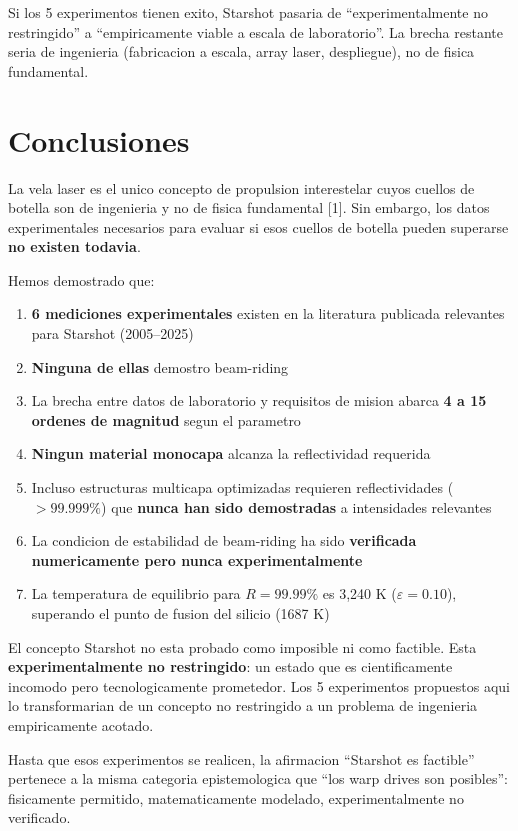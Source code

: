 \documentclass[11pt,a4paper,onecolumn]{article}
\begin{document}
Si los 5 experimentos tienen exito, Starshot pasaria de ``experimentalmente no restringido'' a ``empiricamente viable a escala de laboratorio''. La brecha restante seria de ingenieria (fabricacion a escala, array laser, despliegue), no de fisica fundamental.

\section{Conclusiones}

La vela laser es el unico concepto de propulsion interestelar cuyos cuellos de botella son de ingenieria y no de fisica fundamental [1]. Sin embargo, los datos experimentales necesarios para evaluar si esos cuellos de botella pueden superarse \textbf{no existen todavia}.

Hemos demostrado que:

\begin{enumerate}
  \item \textbf{6 mediciones experimentales} existen en la literatura publicada relevantes para Starshot (2005--2025)
  \item \textbf{Ninguna de ellas} demostro beam-riding
  \item La brecha entre datos de laboratorio y requisitos de mision abarca \textbf{4 a 15 ordenes de magnitud} segun el parametro
  \item \textbf{Ningun material monocapa} alcanza la reflectividad requerida
  \item Incluso estructuras multicapa optimizadas requieren reflectividades ($>99.999\%$) que \textbf{nunca han sido demostradas} a intensidades relevantes
  \item La condicion de estabilidad de beam-riding ha sido \textbf{verificada numericamente pero nunca experimentalmente}
  \item La temperatura de equilibrio para $R=99.99\%$ es 3,240 K ($\varepsilon=0.10$), superando el punto de fusion del silicio (1687 K)
\end{enumerate}

El concepto Starshot no esta probado como imposible ni como factible. Esta \textbf{experimentalmente no restringido}: un estado que es cientificamente incomodo pero tecnologicamente prometedor. Los 5 experimentos propuestos aqui lo transformarian de un concepto no restringido a un problema de ingenieria empiricamente acotado.

Hasta que esos experimentos se realicen, la afirmacion ``Starshot es factible'' pertenece a la misma categoria epistemologica que ``los warp drives son posibles'': fisicamente permitido, matematicamente modelado, experimentalmente no verificado.
\end{document}

